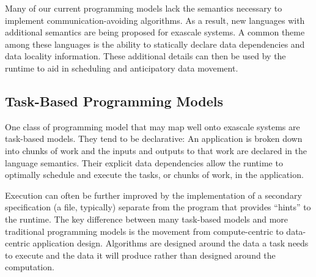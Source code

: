 Many of our current programming models lack the semantics necessary to
implement communication-avoiding algorithms. As a result, new
languages with additional semantics are being proposed for exascale
systems. A common theme among these languages is the ability to
statically declare data dependencies and data locality information.
These additional details can then be used by the runtime to aid in
scheduling and anticipatory data movement.

\subsection{Task-Based Programming Models}

One class of programming model that may map well onto exascale systems
are task-based models. They tend to be declarative: An application is
broken down into chunks of work and the inputs and outputs to that
work are declared in the language semantics. Their explicit data
dependencies allow the runtime to optimally schedule and execute the
tasks, or chunks of work, in the application.

Execution can often be further improved by the implementation of a
secondary specification (a file, typically) separate from the program
that provides ``hints'' to the runtime. The key difference between many
task-based models and more traditional programming models is the
movement from compute-centric to data-centric application design.
Algorithms are designed around the data a task needs to execute and
the data it will produce rather than designed around the computation.

